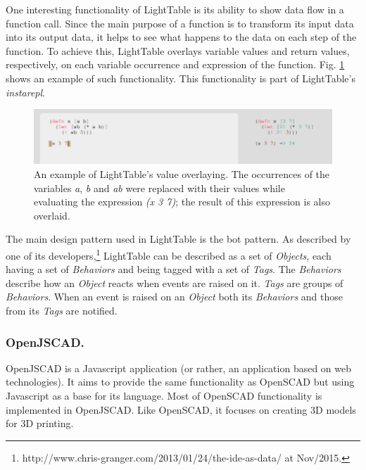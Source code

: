 \documentclass{./llncs2e/llncs}
\begin{document}
	One interesting functionality of LightTable is its ability to show data flow in a function call. 
	Since the main purpose of a function is to transform its input data into its output data, it helps to see what happens to the data on each step of the function. 
	To achieve this, LightTable overlays variable values and return values, respectively, on each variable occurrence and expression of the function. 
	Fig. \ref{fig:lt:val:overlay} shows an example of such functionality. 
	This functionality is part of LightTable's \emph{instarepl}.

	\begin{figure}
		\centering
		\includegraphics[width=1.0\textwidth]{img/lt_val_overlay__inv}
			\caption{An example of LightTable's value overlaying. The occurrences of the variables \emph{a}, \emph{b} and \emph{ab} were replaced with their values while evaluating the expression \emph{(x 3 7)}; the result of this expression is also overlaid.}
		\label{fig:lt:val:overlay}
	\end{figure}

	The main design pattern used in LightTable is the \ac{bot} pattern. 
	As described by one of its developers,\footnote{http://www.chris-granger.com/2013/01/24/the-ide-as-data/ at Nov/2015.} LightTable can be described as a set of \emph{Objects}, each having a set of \emph{Behaviors} and being tagged with a set of \emph{Tags}. 
	The \emph{Behaviors} describe how an \emph{Object} reacts when events are raised on it. \emph{Tags} are groups of \emph{Behaviors}. 
	When an event is raised on an \emph{Object} both its \emph{Behaviors} and those from its \emph{Tags} are notified.

\subsubsection{OpenJSCAD.}
	OpenJSCAD\cite{openjscad2015site} is a Javascript application (or rather, an application based on web technologies).
	It aims to provide the same functionality as OpenSCAD\cite{kintel2011openscad} but using Javascript as a base for its language. 
	Most of OpenSCAD functionality is implemented in OpenJSCAD. 
	Like OpenSCAD, it focuses on creating 3D models for 3D printing.
\end{document}
